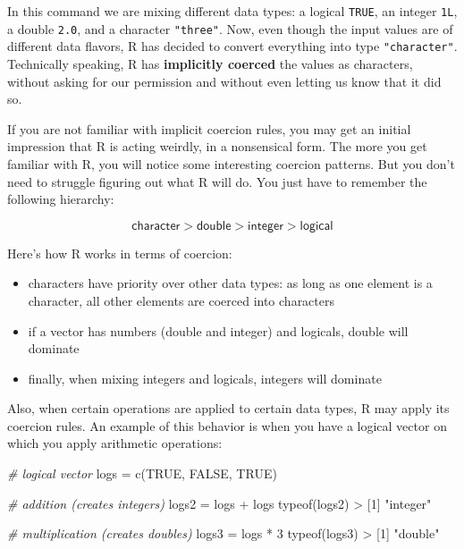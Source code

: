 \documentclass[
]{book}
\newenvironment{Shaded}{\begin{snugshade}}{\end{snugshade}}
\newcommand{\CommentTok}[1]{\textcolor[rgb]{0.56,0.35,0.01}{\textit{#1}}}
\newcommand{\ConstantTok}[1]{\textcolor[rgb]{0.00,0.00,0.00}{#1}}
\newcommand{\DecValTok}[1]{\textcolor[rgb]{0.00,0.00,0.81}{#1}}
\newcommand{\FunctionTok}[1]{\textcolor[rgb]{0.00,0.00,0.00}{#1}}
\newcommand{\NormalTok}[1]{#1}
\newcommand{\OtherTok}[1]{\textcolor[rgb]{0.56,0.35,0.01}{#1}}
\newcommand{\SpecialCharTok}[1]{\textcolor[rgb]{0.00,0.00,0.00}{#1}}
\newcommand{\StringTok}[1]{\textcolor[rgb]{0.31,0.60,0.02}{#1}}
\begin{document}
In this command we are mixing different data types: a logical \texttt{TRUE}, an integer
\texttt{1L}, a double \texttt{2.0}, and a character \texttt{"three"}. Now, even though the input
values are of different data flavors, R has decided to convert everything into
type \texttt{"character"}. Technically speaking, R has \textbf{implicitly coerced} the
values as characters, without asking for our permission and without even
letting us know that it did so.

If you are not familiar with implicit coercion rules, you may get an initial
impression that R is acting weirdly, in a nonsensical form. The more you get
familiar with R, you will notice some interesting coercion patterns. But you
don't need to struggle figuring out what R will do. You just have to remember
the following hierarchy:

\[
\mathsf{character > double > integer > logical}
\]

Here's how R works in terms of coercion:

\begin{itemize}
\item
  characters have priority over other data types: as long as one element is
  a character, all other elements are coerced into characters
\item
  if a vector has numbers (double and integer) and logicals, double will
  dominate
\item
  finally, when mixing integers and logicals, integers will dominate
\end{itemize}

Also, when certain operations are applied to certain data types, R may apply
its coercion rules. An example of this behavior is when you have a logical
vector on which you apply arithmetic operations:

\begin{Shaded}
\begin{Highlighting}[]
\CommentTok{\# logical vector}
\NormalTok{logs }\OtherTok{=} \FunctionTok{c}\NormalTok{(}\ConstantTok{TRUE}\NormalTok{, }\ConstantTok{FALSE}\NormalTok{, }\ConstantTok{TRUE}\NormalTok{)}

\CommentTok{\# addition (creates integers)}
\NormalTok{logs2 }\OtherTok{=}\NormalTok{ logs }\SpecialCharTok{+}\NormalTok{ logs}
\FunctionTok{typeof}\NormalTok{(logs2)}
\SpecialCharTok{\textgreater{}}\NormalTok{ [}\DecValTok{1}\NormalTok{] }\StringTok{"integer"}

\CommentTok{\# multiplication (creates doubles)}
\NormalTok{logs3 }\OtherTok{=}\NormalTok{ logs }\SpecialCharTok{*} \DecValTok{3}
\FunctionTok{typeof}\NormalTok{(logs3)}
\SpecialCharTok{\textgreater{}}\NormalTok{ [}\DecValTok{1}\NormalTok{] }\StringTok{"double"}
\end{Highlighting}
\end{Shaded}
\end{document}

